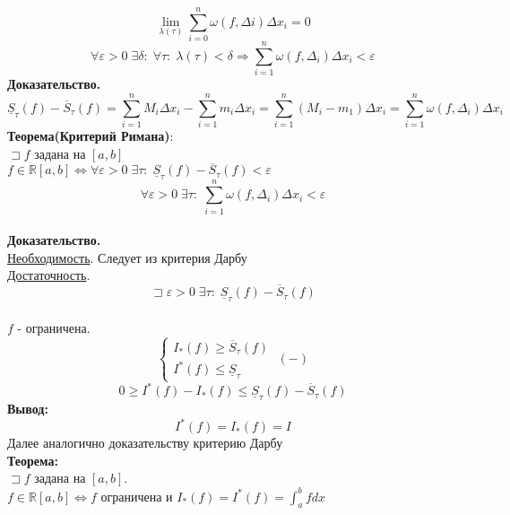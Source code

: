 \documentclass[14pt]{article}
\begin{document}
	$$\boxed{\lim\limits_{\lambda(\tau)}\sum_{i=0}^{n}\omega(f,\Delta i)\Delta x_i=0}$$
	$$\boxed{\forall \varepsilon>0 \; \exists \delta: \; \forall \tau: \; \lambda(\tau)<\delta \Rightarrow \sum_{i=1}^{n}\omega(f,\Delta_i)\Delta x_i<\varepsilon}$$
	\textbf{Доказательство.} \\
	$$\underline{S}_{\tau}(f)-\overline{S}_{\tau}(f)=\sum_{i=1}^{n}M_i \Delta x_i - \sum_{i=1}^{n}m_i \Delta x_i = \sum_{i=1}^{n}(M_i-m_1)\Delta x_i=\sum_{i=1}^{n}\omega(f,\Delta_i)\Delta x_i$$
	\textbf{Теорема(Критерий Римана)}: \\
	$\sqsupset f$ задана на $[a,b]$ \\
	$f \in \mathbb{R}[a,b] \iff \forall \varepsilon>0 \; \exists \tau: \; \underline{S}_{\tau}(f)-\overline{S}_{\tau}(f)<\varepsilon$ \\
	$$\boxed{\forall \varepsilon>0 \; \exists\tau: \; \sum_{i=1}^{n}\omega(f,\Delta_i)\Delta x_i<\varepsilon}$$ \\
	\textbf{Доказательство.} \\
	\underline{Необходимость}. Следует из критерия Дарбу \\
	\underline{Достаточность}. \\
	$$\sqsupset \varepsilon>0 \; \exists \tau: \; \underline{S}_{\tau}(f)-\overline{S}_{\tau}(f)$$ \\
	$f$ - ограничена. 
	$$
	\begin{cases}
		I_*(f)\geqslant\overline{S}_{\tau}(f)\\
		I^*(f)\leqslant \underline{S}_{\tau} 
	\end{cases} \; (-)$$
	$$\boxed{0 \geqslant I^*(f)-I_*(f)\leqslant \underline{S}_{\tau}(f)-\overline{S}_{\tau}(f)}$$
	\textbf{Вывод:} \\
	$$\boxed{I^*(f)=I_*(f)=I}$$
	Далее аналогично доказательству критерию Дарбу \\
	\textbf{Теорема:}\\
	$\sqsupset f$ задана на $[a,b]$. \\
	$f \in \mathbb{R}[a,b] \iff f$ ограничена и $I_*(f)=I^*(f)=\int_{a}^{b}f
	dx$
\end{document}
